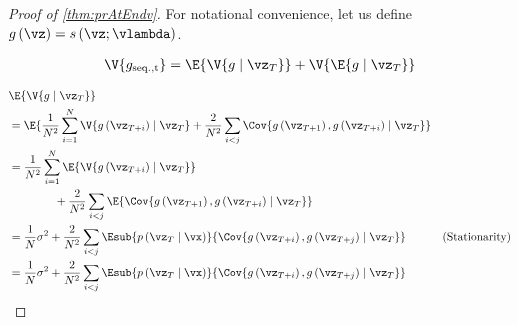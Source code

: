 \label{proofsection:prAtEndv}\begin{proof}[Proof of \autoref{thm:prAtEndv}]\label{proof:prAtEndv}For notational convenience, let us define \(g\left (\vz \right ) = s\left (\vz ; \vlambda \right )\). \par \begin {align} \V {g_{\mathrm {seq., t}}} = \E { \V {g \mid \vz _{T}} } + \V { \E {g \mid \vz _{T}} } \end {align} \par \begin {align} &\E { \V {g \mid \vz _{T}} } \\ &= \E { \frac {1}{N^2} \sum ^{N}_{i=1} \V { g\left (\vz _{T+i}\right ) \mid \vz _{T} } + \frac {2}{N^2} \sum _{i<j} \Cov {g\left (\vz _{T+1}\right ), g\left (\vz _{T+i}\right ) \mid \vz _{T} } } \\ &= \frac {1}{N^2} \sum ^{N}_{i=1} \E { \V { g\left (\vz _{T+i}\right ) \mid \vz _{T} } }\\ &\qquad \qquad + \frac {2}{N^2} \sum _{i<j} \E { \Cov {g\left (\vz _{T+1}\right ), g\left (\vz _{T+i}\right ) \mid \vz _{T} } } \\ &= \frac {1}{N} \sigma ^2 + \frac {2}{N^2} \sum _{i < j} \Esub {p\left (\vz _T\mid \vx \right )}{ \Cov { g\left (\vz _{T+i}\right ), g\left (\vz _{T+j}\right ) \mid \vz _T} } &\text {(Stationarity)} \\ &= \frac {1}{N} \sigma ^2 + \frac {2}{N^2} \sum _{i < j} \Esub {p\left (\vz _T\mid \vx \right )}{ \Cov { g\left (\vz _{T+i}\right ), g\left (\vz _{T+j}\right ) \mid \vz _T} } \end {align}\end{proof}
\prAtEndRestatevi*
